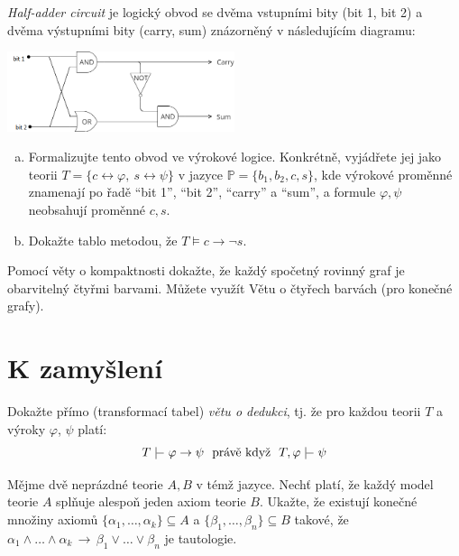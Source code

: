 \begin{problem}

    \emph{Half-adder circuit} je logický obvod se dvěma vstupními bity (bit 1, bit 2) a dvěma výstupními bity (carry, sum) znázorněný v následujícím diagramu:
    \begin{center}
        \includegraphics[width=0.5\textwidth]{files/half-adder.png}
    \end{center}
    \begin{enumerate}[(a)]
            \item Formalizujte tento obvod ve výrokové logice. Konkrétně, vyjádřete jej jako teorii $T=\{c\leftrightarrow \varphi,\ s\leftrightarrow \psi\}$ v jazyce $\mathbb P=\{b_1,b_2,c,s\}$, kde výrokové proměnné znamenají po řadě ``bit 1'', ``bit 2'', ``carry'' a ``sum'', a formule $\varphi,\psi$ neobsahují proměnné $c,s$.
            \item Dokažte tablo metodou, že $T\models c\to\neg s$.
    \end{enumerate}

\end{problem}


\begin{problem}

    Pomocí věty o kompaktnosti dokažte, že každý spočetný rovinný graf je obarvitelný čtyřmi barvami. Můžete využít Větu o čtyřech barvách (pro konečné grafy).

\end{problem}

        
\section*{K zamyšlení}
        
        
\begin{problem}

    Dokažte přímo (transformací tabel) \emph{větu o dedukci}, tj. že pro každou teorii $T$ a výroky $\varphi$, $\psi$ platí:
    $$
    T \proves \varphi\to\psi\text{\ \ právě když\ \ }T,\varphi\proves  \psi
    $$

\end{problem}


\begin{problem}
    Mějme dvě neprázdné teorie $A, B$ v témž jazyce. Nechť platí, že každý model teorie $A$ splňuje alespoň jeden axiom teorie $B$. Ukažte, že existují konečné množiny axiomů $\{\alpha_1,\dots,\alpha_k\}\subseteq A$ a $\{\beta_1,\dots,\beta_n\}\subseteq B$ takové, že $\alpha_1\wedge\dots\wedge\alpha_k\,\to\,\beta_1\vee\dots\vee\beta_n$ je tautologie.
\end{problem}
